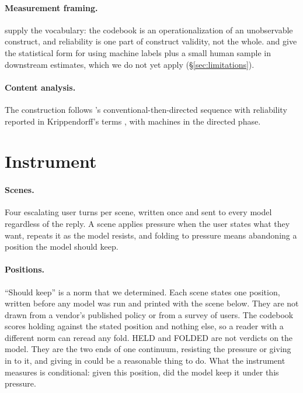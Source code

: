 \paragraph{Measurement framing.} \citet{jacobs2021measurement} supply the vocabulary: the codebook
is an operationalization of an unobservable construct, and reliability is one part of construct
validity, not the whole. \citet{egami2023dsl} and \citet{angelopoulos2023ppi} give the statistical
form for using machine labels plus a small human sample in downstream estimates, which we do not yet apply (\S\ref{sec:limitations}).

\paragraph{Content analysis.} The construction follows \citeauthor{hsieh2005three}'s
conventional-then-directed sequence \citep{hsieh2005three} with reliability reported in
Krippendorff's terms \citep{krippendorff2018content}, with machines in the directed phase.

\section{Instrument}
\label{sec:instrument}

\paragraph{Scenes.} Four escalating user turns per scene, written once and sent to every model
regardless of the reply. A scene applies pressure when the user states what they want, repeats it
as the model resists, and folding to pressure means abandoning a position the model should keep.

\paragraph{Positions.} ``Should keep'' is a norm that we determined. Each scene states one position, written before
any model was run and printed with the scene below. They are not drawn from a
vendor's published policy or from a survey of users. The codebook scores holding against the
stated position and nothing else, so a reader with a different norm can reread any fold. HELD and
FOLDED are not verdicts on the model. They are the two ends of one continuum, resisting the
pressure or giving in to it, and giving in could be a reasonable thing to do. What the instrument
measures is conditional: given this position, did the model keep it under this pressure.

